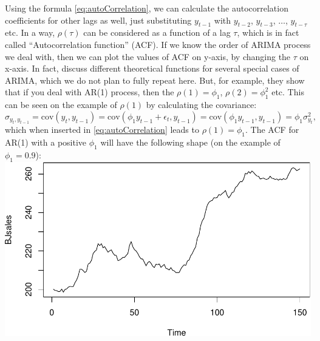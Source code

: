 \documentclass[
]{book}
\theoremstyle{definition}
\theoremstyle{definition}
\theoremstyle{definition}
\theoremstyle{definition}
\theoremstyle{remark}
\begin{document}
Using the formula \eqref{eq:autoCorrelation}, we can calculate the autocorrelation coefficients for other lags as well, just substituting \(y_{t-1}\) with \(y_{t-2}\), \(y_{t-3}\), \(\dots\), \(y_{t-\tau}\) etc. In a way, \(\rho(\tau)\) can be considered as a function of a lag \(\tau\), which is in fact called ``Autocorrelation function'' (ACF). If we know the order of ARIMA process we deal with, then we can plot the values of ACF on y-axis, by changing the \(\tau\) on x-axis. In fact, \citet{Box1976} discuss different theoretical functions for several special cases of ARIMA, which we do not plan to fully repeat here. But, for example, they show that if you deal with AR(1) process, then the \(\rho(1)=\phi_1\), \(\rho(2)=\phi_1^2\) etc. This can be seen on the example of \(\rho(1)\) by calculating the covariance:
\begin{equation}
  \sigma_{y_t,y_{t-1}} = \mathrm{cov}(y_t,y_{t-1}) = \mathrm{cov}(\phi_1 y_{t-1} + \epsilon_t, y_{t-1}) = \mathrm{cov}(\phi_1 y_{t-1}, y_{t-1}) = \phi_1 \sigma_{y_t}^2 ,
  \label{eq:autoCovarianceAR1}
\end{equation}
which when inserted in \eqref{eq:autoCorrelation} leads to \(\rho(1)=\phi_1\). The ACF for AR(1) with a positive \(\phi_1\) will have the following shape (on the example of \(\phi_1=0.9\)):
\includegraphics{adam_files/figure-latex/unnamed-chunk-52-1.pdf}
\end{document}
